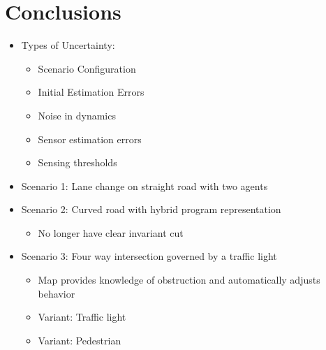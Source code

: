 \documentclass{easychair}
\theoremstyle{theorem}
\theoremstyle{remark}
\begin{document}
\section{Conclusions}

	\begin{itemize}
		\item Types of Uncertainty:
		\begin{itemize}
			\item Scenario Configuration
			\item Initial Estimation Errors
			\item Noise in dynamics
			\item Sensor estimation errors
			\item Sensing thresholds
		\end{itemize}
	\end{itemize}
	\begin{itemize}
		\item Scenario 1: Lane change on straight road with two agents
		
		\item Scenario 2: Curved road with hybrid program representation
		\begin{itemize}
			\item No longer have clear invariant cut
		\end{itemize}
		\item Scenario 3: Four way intersection governed by a traffic light
		\begin{itemize}
			\item Map provides knowledge of obstruction and automatically adjusts behavior
		\end{itemize}
		\begin{itemize}
			\item Variant: Traffic light
			\item Variant: Pedestrian
		\end{itemize}
	\end{itemize}


\label{sect:bib}

%
%
%

\end{document}
